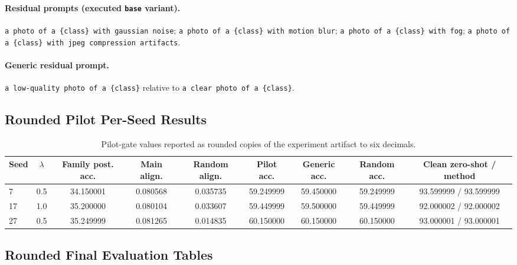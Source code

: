 \documentclass{article}
\begin{document}
\paragraph{Residual prompts (executed \texttt{base} variant).}
\texttt{a photo of a \{class\} with gaussian noise};
\texttt{a photo of a \{class\} with motion blur};
\texttt{a photo of a \{class\} with fog};
\texttt{a photo of a \{class\} with jpeg compression artifacts}.

\paragraph{Generic residual prompt.}
\texttt{a low-quality photo of a \{class\}} relative to \texttt{a clear photo of a \{class\}}.

\subsection{Rounded Pilot Per-Seed Results}

\begin{table}[h]
\caption{Pilot-gate values reported as rounded copies of the experiment artifact to six decimals.}
\label{tab:pilot_exact}
\centering
\scriptsize
\begin{tabular}{lcccccccc}
\toprule
Seed & $\lambda$ & Family post. acc. & Main align. & Random align. & Pilot acc. & Generic acc. & Random acc. & Clean zero-shot / method \\
\midrule
7 & 0.5 & 34.150001 & 0.080568 & 0.035735 & 59.249999 & 59.450000 & 59.249999 & 93.599999 / 93.599999 \\
17 & 1.0 & 35.200000 & 0.080104 & 0.033607 & 59.449999 & 59.500000 & 59.449999 & 92.000002 / 92.000002 \\
27 & 0.5 & 35.249999 & 0.081265 & 0.014835 & 60.150000 & 60.150000 & 60.150000 & 93.000001 / 93.000001 \\
\bottomrule
\end{tabular}
\end{table}

\subsection{Rounded Final Evaluation Tables}
\end{document}

